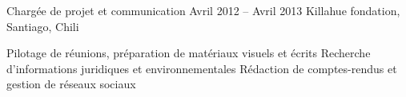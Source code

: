 \begin{joblist}
{{\begin{itemize}

		\end{itemize}
		}
	}

\item[Chargée de projet et communication ]{Avril 2012 -- Avril 2013 }     
  	{
  	Killahue fondation, Santiago, Chili
  	}     
  	{
        \normalsize{
		\iftbftiny \vspace{-0.5cm} \fi
		\begin{itemize}
			  \iftbftiny \setlength\itemsep{-3pt} \fi
			  \cvitem[\checkmark] Pilotage de réunions, préparation de matériaux visuels et écrits                                        
			  \cvitem[\checkmark] Recherche d'informations juridiques et environnementales
			  \cvitem[\checkmark] Rédaction de comptes-rendus et gestion de réseaux sociaux                                         
		\end{itemize}  
		}
	}

   

\end{joblist}


%
%


